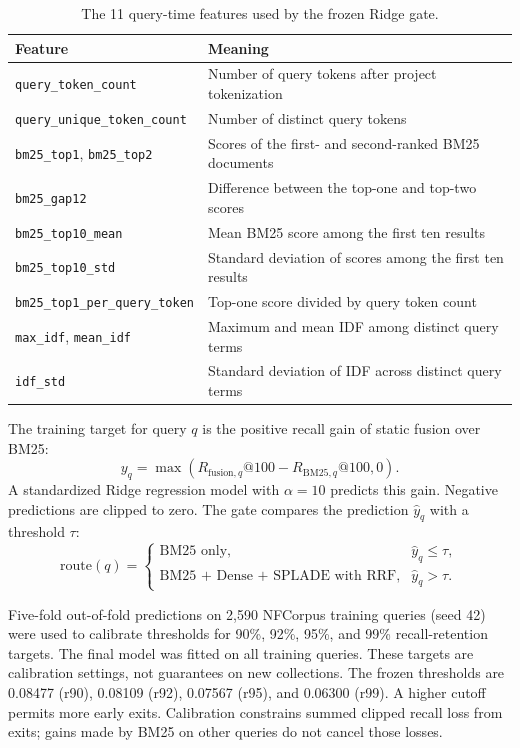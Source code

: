\documentclass[conference]{IEEEtran}
\begin{document}
\begin{table}[t]
\centering
\caption{The 11 query-time features used by the frozen Ridge gate.}
\label{tab:features}
\small
\begin{tabular}{ll}
\toprule
Feature & Meaning\\
\midrule
\texttt{query\_token\_count} & Number of query tokens after project tokenization\\
\texttt{query\_unique\_token\_count} & Number of distinct query tokens\\
\texttt{bm25\_top1}, \texttt{bm25\_top2} & Scores of the first- and second-ranked BM25 documents\\
\texttt{bm25\_gap12} & Difference between the top-one and top-two scores\\
\texttt{bm25\_top10\_mean} & Mean BM25 score among the first ten results\\
\texttt{bm25\_top10\_std} & Standard deviation of scores among the first ten results\\
\texttt{bm25\_top1\_per\_query\_token} & Top-one score divided by query token count\\
\texttt{max\_idf}, \texttt{mean\_idf} & Maximum and mean IDF among distinct query terms\\
\texttt{idf\_std} & Standard deviation of IDF across distinct query terms\\
\bottomrule
\end{tabular}
\end{table}

The training target for query $q$ is the positive recall gain of static fusion over BM25:
\begin{equation}
  y_q=\max\left(R_{\mathrm{fusion},q}@100-R_{\mathrm{BM25},q}@100,0\right).
\end{equation}
A standardized Ridge regression model with $\alpha=10$ predicts this gain. Negative predictions are clipped to zero. The gate compares the prediction $\hat y_q$ with a threshold $\tau$:
\begin{equation}
\text{route}(q)=\begin{cases}
\text{BM25 only}, & \hat y_q\leq\tau,\\
\text{BM25 + Dense + SPLADE with RRF}, & \hat y_q>\tau.
\end{cases}
\end{equation}

Five-fold out-of-fold predictions on 2,590 NFCorpus training queries (seed 42) were used to calibrate thresholds for 90\%, 92\%, 95\%, and 99\% recall-retention targets. The final model was fitted on all training queries. These targets are calibration settings, not guarantees on new collections. The frozen thresholds are 0.08477 (r90), 0.08109 (r92), 0.07567 (r95), and 0.06300 (r99). A higher cutoff permits more early exits. Calibration constrains summed clipped recall loss from exits; gains made by BM25 on other queries do not cancel those losses.
\end{document}
